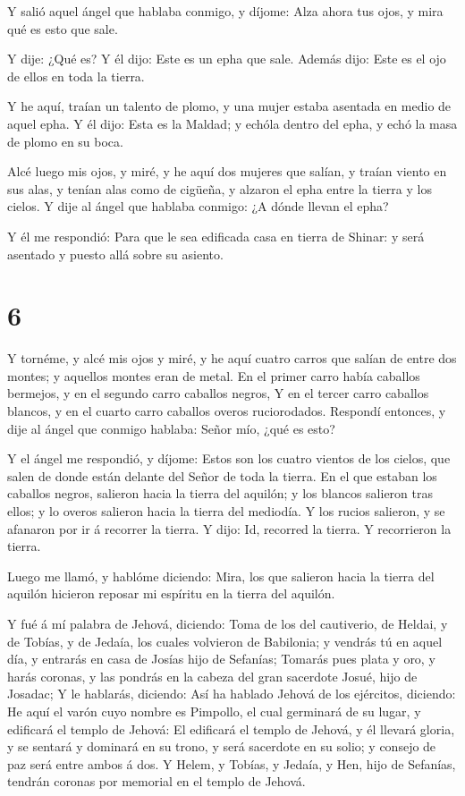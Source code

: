  Y salió aquel ángel que hablaba conmigo, y díjome: Alza
ahora tus ojos, y mira qué es esto que sale.

 Y dije: ¿Qué es? Y él dijo: Este es un epha que sale.
Además dijo: Este es el ojo de ellos en toda la tierra.

 Y he aquí, traían un talento de plomo, y una mujer estaba
asentada en medio de aquel epha.  Y él dijo: Esta es la
Maldad; y echóla dentro del epha, y echó la masa de plomo en su boca.

 Alcé luego mis ojos, y miré, y he aquí dos mujeres que
salían, y traían viento en sus alas, y tenían alas como de cigüeña, y
alzaron el epha entre la tierra y los cielos.  Y dije al
ángel que hablaba conmigo: ¿A dónde llevan el epha?

 Y él me respondió: Para que le sea edificada casa en
tierra de Shinar: y será asentado y puesto allá sobre su asiento.

\hypertarget{section-5}{%
\section{6}\label{section-5}}

 Y tornéme, y alcé mis ojos y miré, y he aquí cuatro carros
que salían de entre dos montes; y aquellos montes eran de metal.
 En el primer carro había caballos bermejos, y en el segundo
carro caballos negros,  Y en el tercer carro caballos
blancos, y en el cuarto carro caballos overos ruciorodados. 
Respondí entonces, y dije al ángel que conmigo hablaba: Señor mío, ¿qué
es esto?

 Y el ángel me respondió, y díjome: Estos son los cuatro
vientos de los cielos, que salen de donde están delante del Señor de
toda la tierra.  En el que estaban los caballos negros,
salieron hacia la tierra del aquilón; y los blancos salieron tras ellos;
y lo overos salieron hacia la tierra del mediodía.  Y los
rucios salieron, y se afanaron por ir á recorrer la tierra. Y dijo: Id,
recorred la tierra. Y recorrieron la tierra.

 Luego me llamó, y hablóme diciendo: Mira, los que salieron
hacia la tierra del aquilón hicieron reposar mi espíritu en la tierra
del aquilón.

 Y fué á mí palabra de Jehová, diciendo:  Toma
de los del cautiverio, de Heldai, y de Tobías, y de Jedaía, los cuales
volvieron de Babilonia; y vendrás tú en aquel día, y entrarás en casa de
Josías hijo de Sefanías;  Tomarás pues plata y oro, y harás
coronas, y las pondrás en la cabeza del gran sacerdote Josué, hijo de
Josadac;  Y le hablarás, diciendo: Así ha hablado Jehová de
los ejércitos, diciendo: He aquí el varón cuyo nombre es Pimpollo, el
cual germinará de su lugar, y edificará el templo de Jehová:
 El edificará el templo de Jehová, y él llevará gloria, y
se sentará y dominará en su trono, y será sacerdote en su solio; y
consejo de paz será entre ambos á dos.  Y Helem, y Tobías,
y Jedaía, y Hen, hijo de Sefanías, tendrán coronas por memorial en el
templo de Jehová.


